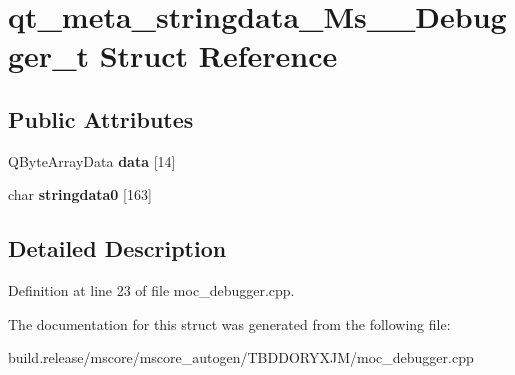 \hypertarget{structqt__meta__stringdata___ms_____debugger__t}{}\section{qt\+\_\+meta\+\_\+stringdata\+\_\+\+Ms\+\_\+\+\_\+\+Debugger\+\_\+t Struct Reference}
\label{structqt__meta__stringdata___ms_____debugger__t}
\subsection*{Public Attributes}
\begin{DoxyCompactItemize}
\item 
\mbox{\label{structqt__meta__stringdata___ms_____debugger__t_ac46f40927cbd03fb7ed552cf874910d2}} 
Q\+Byte\+Array\+Data {\bfseries data} \mbox{[}14\mbox{]}
\item 
\mbox{\label{structqt__meta__stringdata___ms_____debugger__t_a1af47483f4d424fa8caaead850d6ad6a}} 
char {\bfseries stringdata0} \mbox{[}163\mbox{]}
\end{DoxyCompactItemize}


\subsection{Detailed Description}


Definition at line 23 of file moc\+\_\+debugger.\+cpp.



The documentation for this struct was generated from the following file\+:\begin{DoxyCompactItemize}
\item 
build.\+release/mscore/mscore\+\_\+autogen/\+T\+B\+D\+D\+O\+R\+Y\+X\+J\+M/moc\+\_\+debugger.\+cpp\end{DoxyCompactItemize}
